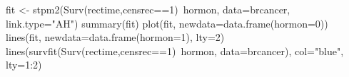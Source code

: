 fit <- stpm2(Surv(rectime,censrec==1)~hormon,
             data=brcancer, link.type="AH")
summary(fit)
plot(fit, newdata=data.frame(hormon=0))
lines(fit, newdata=data.frame(hormon=1), lty=2)
lines(survfit(Surv(rectime,censrec==1)~hormon, data=brcancer), col="blue", lty=1:2)

